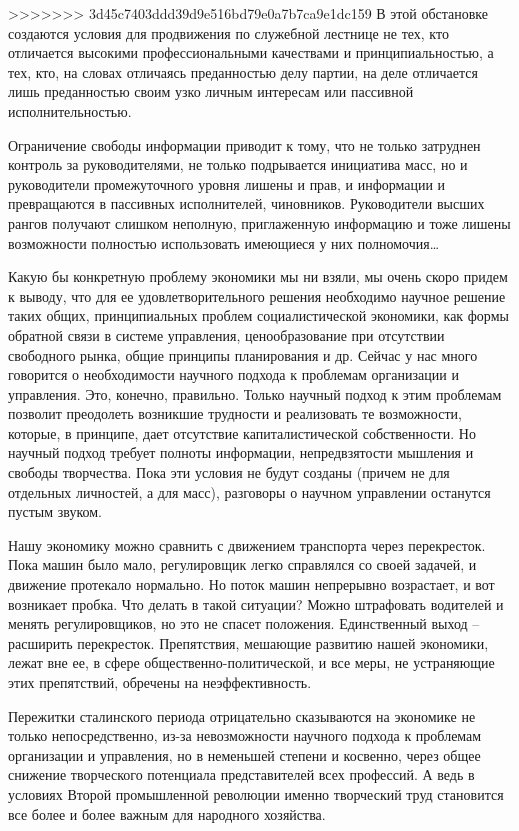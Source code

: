 \documentclass{book}
\begin{document}
>>>>>>> 3d45c7403ddd39d9e516bd79e0a7b7ca9e1dc159
В этой обстановке создаются условия для продвижения по служебной лестнице не тех, кто отличается высокими про­фессиональными 
качествами и принципиальностью, а тех, кто, на словах отличаясь преданностью делу партии, на деле отли­чается лишь преданностью 
своим узко личным интересам или пассивной исполнительностью.

Ограничение свободы информации приводит к тому, что не только затруднен контроль за руководителями, не только под­рывается 
инициатива масс, но и руководители промежуточного уровня лишены и прав, и информации и превращаются в пассив­ных исполнителей, 
чиновников. Руководители высших рангов получают слишком неполную, приглаженную информацию и тоже лишены возможности полностью 
использовать имеющие­ся у них полномочия\ldots

Какую бы конкретную проблему экономики мы ни взяли, мы очень скоро придем к выводу, что для ее удовлетворитель­ного решения 
необходимо научное решение таких общих, прин­ципиальных проблем социалистической экономики, как формы обратной связи в системе 
управления, ценообразование при отсутствии свободного рынка, общие принципы планирования и др. Сейчас у нас много говорится о 
необходимости научного подхода к проблемам организации и управления. Это, конеч­но, правильно. Только научный подход к этим 
проблемам позволит преодолеть возникшие трудности и реализовать те воз­можности, которые, в принципе, дает отсутствие 
капиталисти­ческой собственности. Но научный подход требует полноты ин­формации, непредвзятости мышления и свободы творчества. 
Пока эти условия не будут созданы (причем не для отдельных личностей, а для масс), разговоры о научном управлении оста­нутся 
пустым звуком.

Нашу экономику можно сравнить с движением транспорта через перекресток. Пока машин было мало, регулировщик лег­ко справлялся со 
своей задачей, и движение протекало нормаль­но. Но поток машин непрерывно возрастает, и вот возникает пробка. Что делать в такой 
ситуации? Можно штрафовать води­телей и менять регулировщиков, но это не спасет положения. Единственный выход -- расширить 
перекресток. Препятствия, мешающие развитию нашей экономики, лежат вне ее, в сфере общественно-политической, и все меры, не 
устраняющие этих препятствий, обречены на неэффективность.

Пережитки сталинского периода отрицательно сказываются на экономике не только непосредственно, из-за невозможности научного 
подхода к проблемам организации и управления, но в неменьшей степени и косвенно, через общее снижение твор­ческого потенциала 
представителей всех профессий. А ведь в условиях Второй промышленной революции именно творчес­кий труд становится все более и 
более важным для народного хозяйства.
\end{document}
